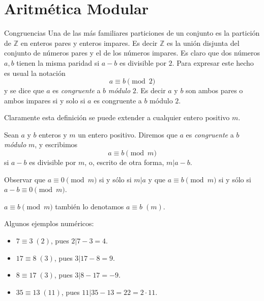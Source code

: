 \chapter[Aritmética Modular]{Aritmética Modular}\label{cap.aritmetica_modular}

\begin{section}{Congruencias}\label{seccion-congruencias}
Una de las más familiares particiones de un conjunto es la partición de $\mathbb Z$ en enteros pares y enteros impares. Es decir $\mathbb Z$ es la unión disjunta del conjunto de números pares y el de los números impares. Es claro que dos números $a,b$ tienen la misma paridad si $a-b$ es divisible por $2$. Para expresar este hecho es usual la notación
$$
a\equiv b \pmod2
$$
y se dice que $a$ es \textit{congruente } a $b$ \textit{módulo} $2$. Es decir $a$ y $b$ son ambos pares o ambos impares si y solo si $a$ es congruente a $b$ módulo $2$.

Claramente esta definición se puede extender a cualquier entero positivo $m$.

\begin{definicion} Sean $a$ y $b$ enteros y $m$ un entero positivo. Diremos que $a$ es {\em congruente} a $b$  {\em módulo} $m$, y escribimos  
$$
a \equiv b \pmod{m}
$$
si $a-b$ es divisible por $m$, o, escrito de otra forma,  $m|a-b$.
\end{definicion}

Observar que $a\equiv 0 \pmod{m}$ si  y sólo si $m|a$ y que $a\equiv b \pmod{m}$ si y sólo si $a-b\equiv 0 \pmod{m}$. 

\begin{notacion*}
    $a \equiv b \pmod{m}$ también  lo denotamos $a \equiv b\; (m)$.

\end{notacion*}

\begin{ejemplo*} Algunos ejemplos  numéricos:
    \begin{itemize}
        \item $7 \equiv 3 \;(2)$, pues $2 | 7-3=4$.
        \item $17 \equiv 8 \;(3)$, pues $3 | 17-8 =9$.  
        \item $8 \equiv 17 \;(3)$, pues $3 | 8-17 =-9$.
        \item $35 \equiv 13 \;(11)$, pues $11| 35-13 = 22 = 2 \cdot 11$. 
    \end{itemize}
\end{ejemplo*}



\end{section}
